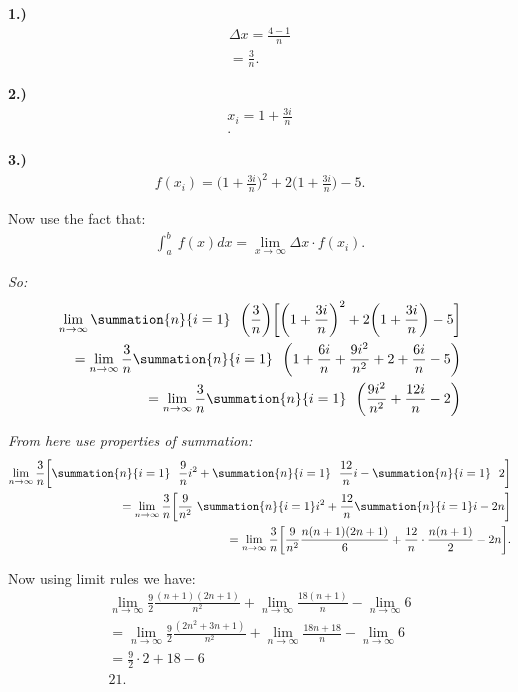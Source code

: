 \documentclass{report}
\begin{document}
\bigbreak \noindent 
\textbf{1.)}
\begin{align*}
  \Delta x = \frac{4-1}{n} \\
  = \frac{3}{n}
.\end{align*}

\bigbreak \noindent 
\textbf{2.)}
\begin{align*}
  x_{i} = 1 + \frac{3i}{n}  \\
.\end{align*}

\bigbreak \noindent 
\textbf{3.) }
\begin{align*}
  f(x_{i}) = \bigg(1+\frac{3i}{n}\bigg)^{2} + 2\bigg(1+\frac{3i}{n}\bigg) -5
.\end{align*}

\bigbreak \noindent 
Now use the fact that:
\begin{align*}
  \int_{a}^{b}\ f(x)dx = \lim\limits_{x \to \infty}{\Delta x \cdot f(x_{i})}
.\end{align*}

\bigbreak \noindent
\textit{So:}
\begin{align*}
  \lim\limits_{n \to \infty}{\summation{n}{i=1}\ \ \bigg(\frac{3}{n}\bigg) \bigg[\bigg(1+\frac{3i}{n}\bigg)^{2} + 2\bigg(1+\frac{3i}{n}\bigg) -5\bigg]} \\
  = \lim\limits_{n \to \infty}{\frac{3}{n}\summation{n}{i=1}\ \ \bigg(1+\frac{6i}{n} + \frac{9i^{2}}{n^{2}} + 2 + \frac{6i}{n} -5\bigg)} \\
  = \lim\limits_{n \to \infty}{\frac{3}{n} \summation{n}{i=1}\ \ \bigg(\frac{9i^{2}}{n^{2}} + \frac{12i}{n} -2\bigg)}
\end{align*}

\bigbreak \noindent 
\textit{From here use properties of summation:}
\begin{align*}
  \lim\limits_{n \to \infty}{\frac{3}{n}\bigg[\summation{n}{i=1}\ \ \frac{9}{n}i^{2} + \summation{n}{i=1}\ \ \frac{12}{n}i - \summation{n}{i=1}\ \ 2\bigg]} \\
  = \lim\limits_{n \to \infty}{\frac{3}{n}\bigg[\frac{9}{n^{2}}\ \summation{n}{i=1} i^{2} + \frac{12}{n}\summation{n}{i=1} i - 2n \bigg]} \\
  = \lim\limits_{n \to \infty}{\frac{3}{n}\bigg[\frac{9}{n^{2}} \frac{n(n+1)(2n+1)}{6} + \frac{12}{n} \cdot \frac{n(n+1)}{2} -2n\bigg]}
.\end{align*}

\bigbreak \noindent 
Now using limit rules we have:
\begin{align*}
  \lim\limits_{n \to \infty}{\frac{9}{2}\frac{(n+1)(2n+1)}{n^{2}}} + \lim\limits_{n \to \infty}{\frac{18(n+1)}{n}} - \lim\limits_{n \to \infty}{6} \\
  = \lim\limits_{n \to \infty}{\frac{9}{2}\frac{(2n^{2} +3n+1)}{n^{2}}} + \lim\limits_{n \to \infty}{\frac{18n+18}{n}} - \lim\limits_{n \to \infty}{6} \\
  = \frac{9}{2} \cdot 2 + 18 - 6 \\
  \boxed{21}
.\end{align*}
\bigbreak \noindent 
{}
\end{document}
